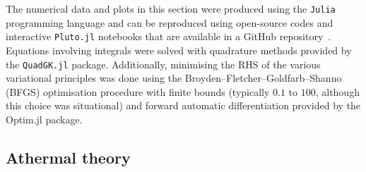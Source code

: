 The numerical data and plots in this section were produced using the \texttt{Julia} programming language and can be reproduced using open-source codes and interactive \texttt{Pluto.jl} notebooks that are available in a GitHub repository~\cite{frost_jarvistpolaronmobilityjl_2023}. Equations involving integrals were solved with quadrature methods provided by the \texttt{QuadGK.jl} package. Additionally, minimising the RHS of the various variational principles was done using the Broyden–Fletcher–Goldfarb–Shanno (BFGS) optimisation procedure with finite bounds (typically $0.1$ to $100$, although this choice was situational) and forward automatic differentiation provided by the Optim.jl package.

\subsection{Athermal theory}

